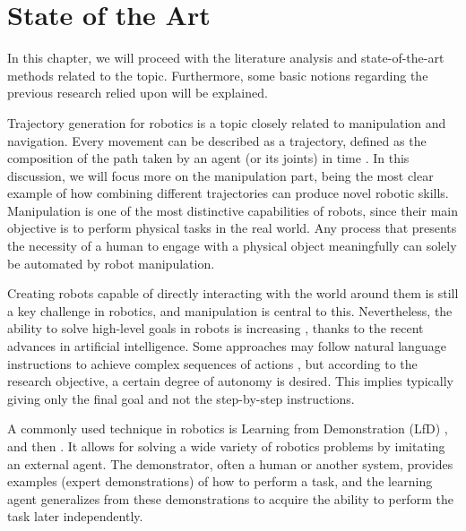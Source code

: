 \chapter{State of the Art} %
\label{chap:background}

In this chapter, we will proceed with the literature analysis and state-of-the-art methods related to the topic. Furthermore, some basic notions regarding the previous research relied upon will be explained.

Trajectory generation for robotics is a topic closely related to manipulation and navigation. Every movement can be described as a trajectory, defined as the composition of the path taken by an agent (or its joints) in time \cite{biagiotti2008trajectory}. 
In this discussion, we will focus more on the manipulation part, being the most clear example of how combining different trajectories can produce novel robotic skills. Manipulation is one of the most distinctive capabilities of robots, since their main objective is to perform physical tasks in the real world. Any process that presents the necessity of a human to engage with a physical object meaningfully can solely be automated by robot manipulation. \cite{rosen2022role}

Creating robots capable of directly interacting with the world around them is still a key challenge in robotics, and manipulation is central to this. \cite{kroemer2021review} 
Nevertheless, the ability to solve high-level goals in robots is increasing \cite{gupta2019relay}, \cite{simeonov2021long} thanks to the recent advances in artificial intelligence.  
Some approaches may follow natural language instructions to achieve complex sequences of actions \cite{hu2019hierarchical}, but according to the research objective, a certain degree of autonomy is desired. This implies typically giving only the final goal and not the step-by-step instructions. 



A commonly used technique in robotics is Learning from Demonstration (LfD) \cite{ARGALL2009469}, and then \cite{ravichandar2020recent}. It allows for solving a wide variety of robotics problems by imitating an external agent. The demonstrator, often a human or another system, provides examples (expert demonstrations) of how to perform a task, and the learning agent generalizes from these demonstrations to acquire the ability to perform the task later independently.

